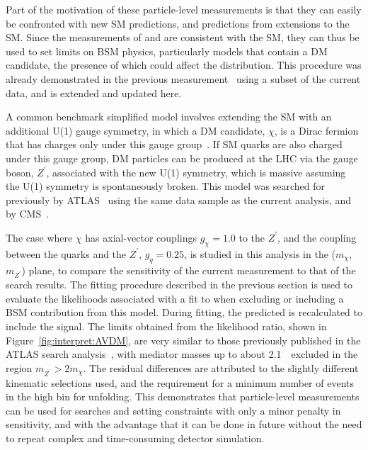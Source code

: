 \documentclass[atlasdraft=false, cernpreprint, UKenglish, texmf, orcidlogo]{atlasdoc}
\begin{document}
Part of the motivation of these particle-level measurements is that they can easily be confronted with new SM predictions, and predictions
from extensions to the SM\@. Since the measurements of \ptmiss and \rmiss are consistent with the SM, they can thus be used to set limits on BSM
physics, particularly models that contain a DM candidate, the presence of which could affect the \ptmiss
distribution. This procedure was already demonstrated in the previous measurement~\cite{EXOT-2016-03} using a subset of the current data,
and is extended and updated here.
 
 
A common benchmark simplified model involves extending the SM with an additional U(1) gauge symmetry, in which a DM candidate, $\chi$,
is a Dirac fermion that has charges only under this gauge group~\cite{Abdallah:2015ter}.
If SM quarks are also charged under this gauge group, DM particles can be produced at
the LHC via the gauge boson, $Z^\prime$, associated with the new U(1) symmetry, which is massive assuming the U(1) symmetry is
spontaneously broken.
This  model was searched for previously by ATLAS~\cite{ATLAS:2021kxv} using the same data sample as the current analysis,
and by CMS~\cite{CMS:2021far}.
 
The case where $\chi$ has axial-vector couplings $g_{\chi}=1.0$ to the $Z^\prime$, and the coupling between the quarks and the $Z^\prime$, $g_{q}=0.25$,
is studied in this analysis in the ($m_{\chi}$, $m_{Z^\prime}$) plane, to compare the sensitivity of the current measurement
to that of the search results.
The fitting procedure described in the previous section is used to evaluate the likelihoods associated with a fit to \rmiss
when excluding or including a BSM contribution from this model. During fitting, the predicted \rmiss is recalculated to include the signal.
The limits obtained from the likelihood ratio, shown in Figure~\ref{fig:interpret:AVDM}, are very similar to those previously published in the ATLAS search
analysis~\cite{ATLAS:2021kxv}, with mediator masses up to about 2.1~\TeV\ excluded in the region $m_{Z^\prime}>2m_{\chi}$. The residual differences
are attributed to the slightly different kinematic selections used, and the requirement for a minimum number of events in the high \ptmiss
bin for unfolding.
This demonstrates that particle-level measurements can be used for searches and setting constraints with only a minor penalty in sensitivity, and with the advantage that it can be done in future without the need to repeat complex and time-consuming detector simulation.
 
\end{document}
